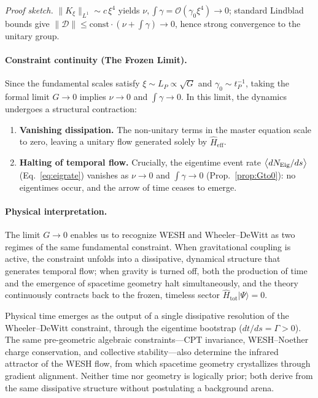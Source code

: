 \documentclass[12pt,a4paper]{article}
\numberwithin{equation}{section}
\begin{document}
\noindent\emph{Proof sketch.} $\|K_\xi\|_{L^1}\sim c\,\xi^4$ yields
$\nu,\int\gamma=\mathcal{O}(\gamma_0\xi^4)\to 0$; standard Lindblad bounds
give $\|\mathcal{D}\|\le \mathrm{const}\cdot(\nu+\int\gamma)\to 0$, hence
strong convergence to the unitary group.

\paragraph{Constraint continuity (The Frozen Limit).}
Since the fundamental scales satisfy $\xi \sim L_P \propto \sqrt{G}$ and 
$\gamma_0 \sim t_P^{-1}$, taking the formal limit $G\to 0$ implies 
$\nu\to 0$ and $\int\gamma\to 0$. In this limit, the dynamics undergoes 
a structural contraction:
\begin{enumerate}[label=(\roman*),leftmargin=1.5em]
\item \textbf{Vanishing dissipation.} The non-unitary terms in the master 
equation scale to zero, leaving a unitary flow generated solely by 
$\hat{H}_{\mathrm{eff}}$.
\item \textbf{Halting of temporal flow.} Crucially, the eigentime event
rate $\big\langle dN_{\rm Eig}/ds\big\rangle$ (Eq.~\ref{eq:eigrate})
vanishes as $\nu\to 0$ and $\int\gamma\to 0$ (Prop.~\ref{prop:Gto0}):
no eigentimes occur, and the arrow of time ceases to emerge.
\end{enumerate}

\paragraph{Physical interpretation.}
The limit $G\to 0$ enables us to recognize WESH and Wheeler--DeWitt as 
two regimes of the same fundamental constraint. When gravitational coupling 
is active, the constraint unfolds into a dissipative, dynamical structure 
that generates temporal flow; when gravity is turned off, both the production 
of time and the emergence of spacetime geometry halt simultaneously, and the 
theory continuously contracts back to the frozen, timeless sector 
$\hat{H}_{\mathrm{tot}}|\Psi\rangle=0$. 

Physical time emerges as the output of a single dissipative resolution of the Wheeler--DeWitt constraint, through the eigentime bootstrap ($dt/ds=\Gamma>0$). The same pre-geometric algebraic constraints---CPT invariance, WESH--Noether charge conservation, and collective stability---also determine the infrared attractor of the WESH flow, from which spacetime geometry crystallizes through gradient alignment. Neither time nor geometry is logically prior; both derive from the same dissipative structure without postulating a background arena.
\end{document}
